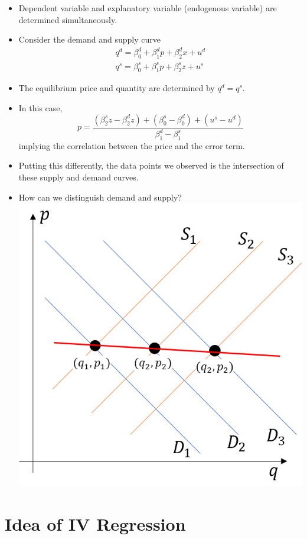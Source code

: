 \documentclass[]{book}
\begin{document}
\begin{itemize}
\item
  Dependent variable and explanatory variable (endogenous variable) are
  determined simultaneously.
\item
  Consider the demand and supply curve \[
  \begin{aligned}
  q^{d}   =\beta_{0}^{d}+\beta_{1}^{d}p+\beta_{2}^{d}x+u^{d} \\
  q^{s}   =\beta_{0}^{s}+\beta_{1}^{s}p+\beta_{2}^{s}z+u^{s}
  \end{aligned}
  \]
\item
  The equilibrium price and quantity are determined by \(q^{d}=q^{s}\).
\item
  In this case, \[
  p=\frac{(\beta_{2}^{s}z-\beta_{2}^{d}z)+(\beta_{0}^{s}-\beta_{0}^{d})+(u^{s}-u^{d})}{\beta_{1}^{d}-\beta_{1}^{s}}
  \] implying the correlation between the price and the error term.
\item
  Putting this differently, the data points we observed is the
  intersection of these supply and demand curves.
\item
  How can we distinguish demand and supply?
  \includegraphics{fig_Demand_Supply.png}
\end{itemize}

\section{Idea of IV Regression}\label{idea-of-iv-regression}
\end{document}
